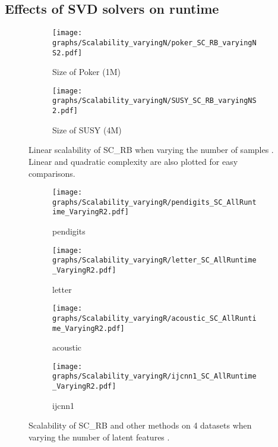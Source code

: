 \documentclass[sigconf]{acmart}
\newcommand{\1}{\boldsymbol{1}}
\newcommand{\0}{\boldsymbol{0}}
\begin{document}
\subsection{Effects of SVD solvers on runtime}

\begin{figure}[!htb]
\centering
	  \begin{subfigure}[b]{0.23\textwidth}
      \texttt{[image: graphs/Scalability\_varyingN/poker\_SC\_RB\_varyingNS2.pdf]}
      \caption{Size of Poker (1M)}
      \label{fig:scalability_varyingN_poker}
      \end{subfigure}
	  \begin{subfigure}[b]{0.23\textwidth}
      \texttt{[image: graphs/Scalability\_varyingN/SUSY\_SC\_RB\_varyingNS2.pdf]}
      \caption{Size of SUSY (4M)}
      \label{fig:scalability_varyingN_susy}
      \end{subfigure}
\caption{Linear scalability of SC\_RB when varying the number of samples . Linear and quadratic complexity are also plotted for easy comparisons.}
\label{fig:scalability_varyingN}
\end{figure}

\begin{figure*}[!htb]
\centering
	  \begin{subfigure}[b]{0.23\textwidth}
      \texttt{[image: graphs/Scalability\_varyingR/pendigits\_SC\_AllRuntime\_VaryingR2.pdf]}
      \caption{pendigits}
      \label{fig:scalability_varyingR_pendigits}
      \end{subfigure}
	  \begin{subfigure}[b]{0.23\textwidth}
      \texttt{[image: graphs/Scalability\_varyingR/letter\_SC\_AllRuntime\_VaryingR2.pdf]}
      \caption{letter}
      \label{fig:scalability_varyingR_letter}
      \end{subfigure}
      \begin{subfigure}[b]{0.23\textwidth}
      \texttt{[image: graphs/Scalability\_varyingR/acoustic\_SC\_AllRuntime\_VaryingR2.pdf]}
      \caption{acoustic}
      \label{fig:scalability_varyingR_acoustic}
      \end{subfigure}
       \begin{subfigure}[b]{0.23\textwidth}
      \texttt{[image: graphs/Scalability\_varyingR/ijcnn1\_SC\_AllRuntime\_VaryingR2.pdf]}
      \caption{ijcnn1}
      \label{fig:scalability_varyingR_ijcnn1}
      \end{subfigure}
\caption{Scalability of SC\_RB and other methods on 4 datasets when varying the number of latent features .}
\label{fig:scalability_varyingR}
\end{figure*}
\end{document}
